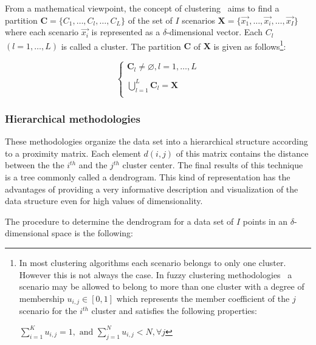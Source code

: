 From a mathematical viewpoint, the concept of clustering~\cite{SurveyClustering} aims to find a partition $\mathbf{C}=\{C_{1},\ldots,C_{l},\ldots,{C_{L}}\}$
of the set of $I$ scenarios
    $\mathbf{X} = \{\vec{x_{1}},\ldots,\vec{x_{i}},\ldots,\vec{x_{I}}\}$
where each scenario $\vec{x_{i}}$ is represented as a $\delta$-dimensional vector.
Each $C_{l}$ $(l=1,\ldots,L)$ is called a cluster. The partition
    $ \mathbf{C} $ of $ \mathbf{X} $
is given as follows\footnote{In most clustering algorithms each scenario belongs to only one cluster. However this is not always the case. In fuzzy clustering methodologies~\cite{ZioMaio} a scenario may be allowed to belong to more than one cluster with a degree of membership
\begin{math} u_{i,j}\in [0,1] \end{math} which represents the member coefficient of the $j$ scenario for the $i^{th}$ cluster and satisfies the following properties:

$ \sum_{i=1}^{K}u_{i,j}=1,  \text{ and }  \sum_{j=1}^{N}u_{i,j}<N, \forall j $}:

    \begin{equation}\label{eq: ClassRequier}
        \begin{cases} \mathbf{C}_{l}\neq\varnothing, l=1,\ldots,L \\
                        \\
                     \bigcup_{l=1}^{L}\mathbf{C}_{l}= \mathbf{X} \\
        \end{cases}
    \end{equation}

\subsubsection{Hierarchical methodologies}
\label{Hierarchical}

These methodologies organize the data set into a hierarchical structure according to a proximity matrix. Each element $d(i,j)$ of this matrix contains the distance between the the $i^{th}$ and the $j^{th}$ cluster center. The final results of this technique is a tree commonly called a dendrogram. This kind of representation has the advantages of providing a very informative description and visualization of the data structure even for high values of dimensionality.

The procedure to determine the dendrogram for a data set of $I$ points in an $\delta$-dimensional space is the following:

